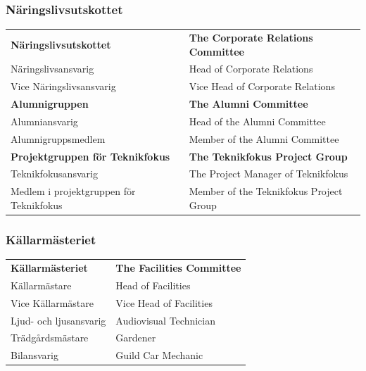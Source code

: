 \documentclass{dsekprotokoll}
\begin{document}
\subsubsection*{Näringslivsutskottet}
\vspace{12pt}
\begin{center}
    \begin{tabular}{R{7.4cm}|L{7.4cm}}
        \textbf{Näringslivsutskottet} & \textbf{The Corporate Relations Committee}\\
        Näringslivsansvarig & Head of Corporate Relations\\
        Vice Näringslivsansvarig & Vice Head of Corporate Relations\\

        \textbf{Alumnigruppen} & \textbf{The Alumni Committee}\\
        Alumniansvarig & Head of the Alumni Committee\\
        Alumnigruppsmedlem & Member of the Alumni Committee\\

        \textbf{Projektgruppen för Teknikfokus} & \textbf{The Teknikfokus Project Group}\\
        Teknikfokusansvarig & The Project Manager of Teknikfokus\\
        Medlem i projektgruppen för Teknikfokus & Member of the Teknikfokus Project Group
    \end{tabular}
\end{center}

\subsubsection*{Källarmästeriet}
\vspace{12pt}
\begin{center}
    \begin{tabular}{R{6.5cm}|L{6.5cm}}
        \textbf{Källarmästeriet} & \textbf{The Facilities Committee}\\
        Källarmästare & Head of Facilities\\
        Vice Källarmästare & Vice Head of Facilities\\
        Ljud- och ljusansvarig & Audiovisual Technician\\
        Trädgårdsmästare & Gardener\\
        Bilansvarig & Guild Car Mechanic\\
    \end{tabular}
\end{center}
\end{document}

